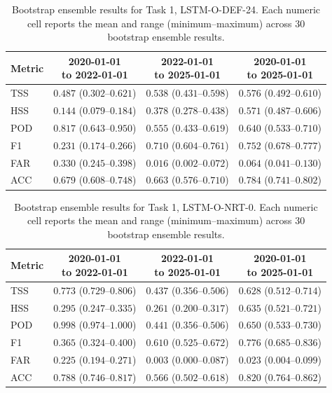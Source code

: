 \begin{table}[htbp]
\centering
\small
\caption{Bootstrap ensemble results for Task 1, LSTM-O-DEF-24. Each numeric cell reports the mean and range (minimum--maximum) across 30 bootstrap ensemble results.}
\label{tab:app-task1-lstm-o-def-24}
\begin{tabular}{lccc}
\toprule
Metric & \shortstack{2020-01-01\\to 2022-01-01} & \shortstack{2022-01-01\\to 2025-01-01} & \shortstack{2020-01-01\\to 2025-01-01} \\
\midrule
TSS & $0.487$ ($0.302$--$0.621$) & $0.538$ ($0.431$--$0.598$) & $0.576$ ($0.492$--$0.610$) \\
HSS & $0.144$ ($0.079$--$0.184$) & $0.378$ ($0.278$--$0.438$) & $0.571$ ($0.487$--$0.606$) \\
POD & $0.817$ ($0.643$--$0.950$) & $0.555$ ($0.433$--$0.619$) & $0.640$ ($0.533$--$0.710$) \\
F1 & $0.231$ ($0.174$--$0.266$) & $0.710$ ($0.604$--$0.761$) & $0.752$ ($0.678$--$0.777$) \\
FAR & $0.330$ ($0.245$--$0.398$) & $0.016$ ($0.002$--$0.072$) & $0.064$ ($0.041$--$0.130$) \\
ACC & $0.679$ ($0.608$--$0.748$) & $0.663$ ($0.576$--$0.710$) & $0.784$ ($0.741$--$0.802$) \\
\bottomrule
\end{tabular}
\end{table}
\clearpage

\begin{table}[htbp]
\centering
\small
\caption{Bootstrap ensemble results for Task 1, LSTM-O-NRT-0. Each numeric cell reports the mean and range (minimum--maximum) across 30 bootstrap ensemble results.}
\label{tab:app-task1-lstm-o-nrt-0}
\begin{tabular}{lccc}
\toprule
Metric & \shortstack{2020-01-01\\to 2022-01-01} & \shortstack{2022-01-01\\to 2025-01-01} & \shortstack{2020-01-01\\to 2025-01-01} \\
\midrule
TSS & $0.773$ ($0.729$--$0.806$) & $0.437$ ($0.356$--$0.506$) & $0.628$ ($0.512$--$0.714$) \\
HSS & $0.295$ ($0.247$--$0.335$) & $0.261$ ($0.200$--$0.317$) & $0.635$ ($0.521$--$0.721$) \\
POD & $0.998$ ($0.974$--$1.000$) & $0.441$ ($0.356$--$0.506$) & $0.650$ ($0.533$--$0.730$) \\
F1 & $0.365$ ($0.324$--$0.400$) & $0.610$ ($0.525$--$0.672$) & $0.776$ ($0.685$--$0.836$) \\
FAR & $0.225$ ($0.194$--$0.271$) & $0.003$ ($0.000$--$0.087$) & $0.023$ ($0.004$--$0.099$) \\
ACC & $0.788$ ($0.746$--$0.817$) & $0.566$ ($0.502$--$0.618$) & $0.820$ ($0.764$--$0.862$) \\
\bottomrule
\end{tabular}
\end{table}
\clearpage

